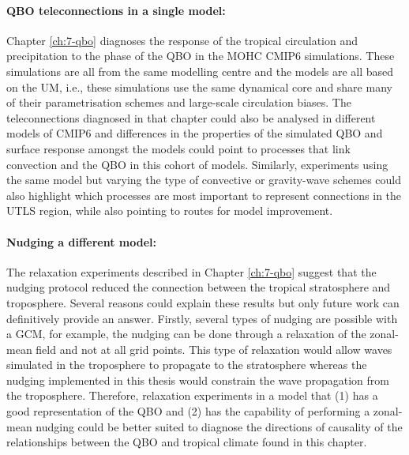 \paragraph{QBO teleconnections in a single model:}
Chapter \ref{ch:7-qbo} diagnoses the response of the tropical circulation and precipitation to the phase of the QBO in the MOHC CMIP6 simulations. 
These simulations are all from the same modelling centre and the models are all based on the UM, i.e., these simulations use the same dynamical core and share many of their parametrisation schemes and large-scale circulation biases. 
The teleconnections diagnosed in that chapter could also be analysed in different models of CMIP6 and differences in the properties of the simulated QBO and surface response amongst the models could point to processes that link convection and the QBO in this cohort of models. 
Similarly, experiments using the same model but varying the type of convective or gravity-wave schemes could also highlight which processes are most important to represent connections in the UTLS region, while also pointing to routes for model improvement. 

\paragraph{Nudging a different model:} 
The relaxation experiments described in Chapter \ref{ch:7-qbo} suggest that the nudging protocol reduced the connection between the tropical stratosphere and troposphere. 
Several reasons could explain these results but only future work can definitively provide an answer. 
Firstly, several types of nudging are possible with a GCM, for example, the nudging can be done through a relaxation of the zonal-mean field and not at all grid points. 
This type of relaxation would allow waves simulated in the troposphere to propagate to the stratosphere whereas the nudging implemented in this thesis would constrain the wave propagation from the troposphere. 
Therefore, relaxation experiments in a model that (1) has a good representation of the QBO and (2) has the capability of performing a zonal-mean nudging could be better suited to diagnose the directions of causality of the relationships between the QBO and tropical climate found in this chapter.

 




